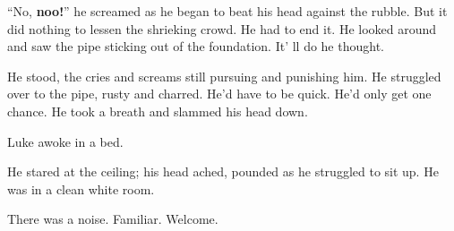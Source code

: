 ``No, {\bf noo!}'' he screamed as he began to beat his head against the
rubble. But it did nothing to lessen the shrieking crowd. He had to end
it. He looked around and saw the pipe sticking out of the foundation. It'
ll do he thought.

He stood, the cries and screams still pursuing and punishing him. He
struggled over to the pipe, rusty and charred. He'd have to be
quick. He'd only get one chance. He took a breath and slammed his head
down.

Luke awoke in a bed.

He stared at the ceiling; his head ached, pounded as he struggled to sit
up. He was in a clean white room.

There was a noise. Familiar. Welcome.




